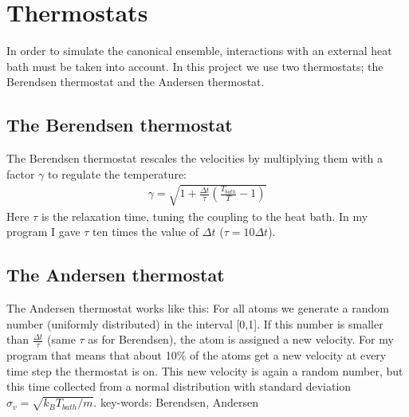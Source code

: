 \section{Thermostats}
In order to simulate the canonical ensemble, interactions with an external heat bath must be taken into account. In this project we use two thermostats; the Berendsen thermostat and the Andersen thermostat.
\subsection{The Berendsen thermostat}
The Berendsen thermostat rescales the velocities by multiplying them with a factor $\gamma$ to regulate the temperature:
\begin{align}
 \gamma = \sqrt{1 + \frac{\Delta t}{\tau}\left(\frac{T_{bath}}{T} - 1\right)}
\end{align}
Here $\tau$ is the relaxation time, tuning the coupling to the heat bath. In my program I gave $\tau$ ten times the value of $\Delta t$ ($\tau = 10\Delta t$).

\subsection{The Andersen thermostat}
The Andersen thermostat works like this: For all atoms we generate a random number (uniformly distributed) in the interval [0,1]. If this number is smaller than $\frac{\Delta t}{\tau}$ (same $\tau$ as for Berendsen),
the atom is assigned a new velocity. For my program that means that about 10\% of the atoms get a new velocity at every time step the thermostat is on. This new velocity is again a random number, but this time collected
from a normal distribution with standard deviation $\sigma_v = \sqrt{k_B T_{bath}/m}$.
key-words: Berendsen, Andersen